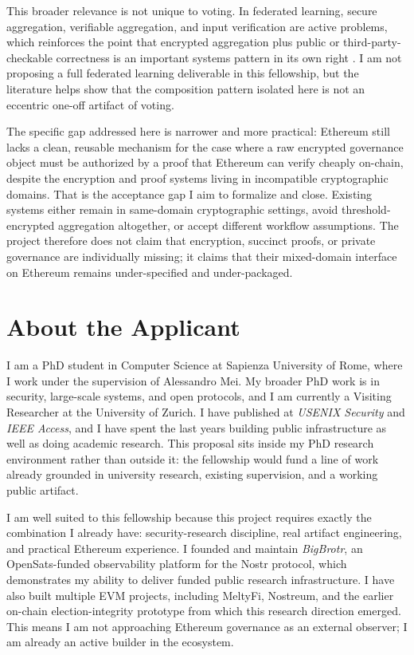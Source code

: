 \documentclass[11pt]{article}
\begin{document}
This broader relevance is not unique to voting. In federated learning, secure
aggregation, verifiable aggregation, and input verification are active problems,
which reinforces the point that encrypted aggregation plus public or
third-party-checkable correctness is an important systems pattern in its own
right \cite{veriflfix2022,lzksa2025}. I am not proposing a full federated
learning deliverable in this fellowship, but the literature helps show that the
composition pattern isolated here is not an eccentric one-off artifact of
voting.

The specific gap addressed here is narrower and more practical: Ethereum still
lacks a clean, reusable mechanism for the case where a raw encrypted governance
object must be authorized by a proof that Ethereum can verify cheaply on-chain,
despite the encryption and proof systems living in incompatible cryptographic
domains. That is the acceptance gap I aim to formalize and close. Existing systems either remain in same-domain
cryptographic settings, avoid threshold-encrypted aggregation altogether, or
accept different workflow assumptions. The project therefore does not claim that
encryption, succinct proofs, or private governance are individually missing; it
claims that their mixed-domain interface on Ethereum remains under-specified and
under-packaged.


\section{About the Applicant}

I am a PhD student in Computer Science at Sapienza University of Rome, where I
work under the supervision of Alessandro Mei. My broader PhD work is in
security, large-scale systems, and open protocols, and I am currently a
Visiting Researcher at the University of Zurich. I have published at
\textit{USENIX Security} and \textit{IEEE Access}, and I have spent the last
years building public infrastructure as well as doing academic research. This
proposal sits inside my PhD research environment rather than outside it: the
fellowship would fund a line of work already grounded in university research,
existing supervision, and a working public artifact.

I am well suited to this fellowship because this project requires exactly the
combination I already have: security-research discipline, real artifact
engineering, and practical Ethereum experience. I founded and maintain
\textit{BigBrotr}, an OpenSats-funded observability platform for the Nostr
protocol, which demonstrates my ability to deliver funded public research
infrastructure. I have also built multiple EVM projects, including MeltyFi,
Nostreum, and the earlier on-chain election-integrity prototype from which this
research direction emerged. This means I am not approaching Ethereum governance
as an external observer; I am already an active builder in the ecosystem.
\end{document}
